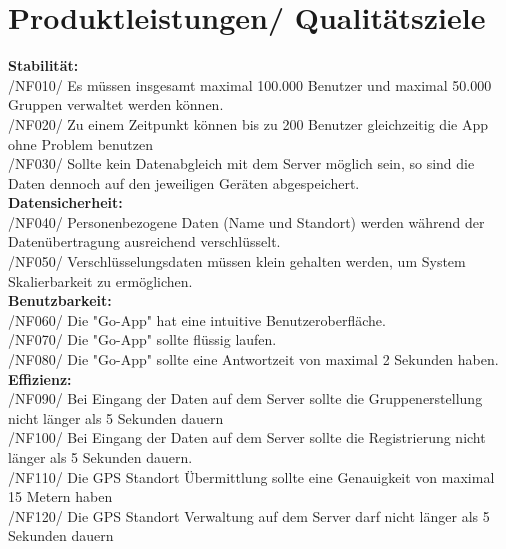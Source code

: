 \section{Produktleistungen/ Qualitätsziele}
\textbf{Stabilität:}\\
/NF010/	Es müssen insgesamt maximal 100.000 Benutzer und maximal 50.000 Gruppen verwaltet werden können. \\
/NF020/	Zu einem Zeitpunkt können bis zu 200 Benutzer gleichzeitig die App ohne Problem benutzen \\
/NF030/	Sollte kein Datenabgleich mit dem Server möglich sein, so sind die Daten dennoch auf den jeweiligen Geräten abgespeichert.	  \\
\textbf{Datensicherheit:}\\
/NF040/	Personenbezogene Daten (Name und Standort) werden während der Datenübertragung ausreichend verschlüsselt.\\
/NF050/	Verschlüsselungsdaten müssen klein gehalten werden, um System Skalierbarkeit zu ermöglichen.\\
\textbf{Benutzbarkeit:}\\
/NF060/	Die "Go-App" hat eine intuitive Benutzeroberfläche.\\
/NF070/	Die "Go-App" sollte flüssig laufen.\\
/NF080/	Die "Go-App" sollte eine Antwortzeit von maximal 2 Sekunden haben.\\

\textbf{Effizienz:}\\
/NF090/	Bei Eingang der Daten auf dem Server sollte die Gruppenerstellung nicht länger als 5 Sekunden dauern\\
/NF100/	Bei Eingang der Daten auf dem Server sollte die Registrierung nicht länger als 5 Sekunden dauern.\\
/NF110/	Die GPS Standort Übermittlung sollte eine Genauigkeit von maximal 15 Metern haben\\
/NF120/	Die GPS Standort Verwaltung auf dem Server darf nicht länger als 5 Sekunden dauern  \\


